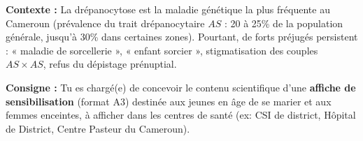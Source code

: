 \documentclass[11pt]{article}
\begin{document}
\begin{exercice}
\textbf{Contexte :} La drépanocytose est la maladie génétique la plus fréquente au Cameroun (prévalence du trait drépanocytaire $AS$ : 20 à 25\% de la population générale, jusqu'à 30\% dans certaines zones). Pourtant, de forts préjugés persistent : « maladie de sorcellerie », « enfant sorcier », stigmatisation des couples $AS \times AS$, refus du dépistage prénuptial.

\textbf{Consigne :} Tu es chargé(e) de concevoir le contenu scientifique d'une \textbf{affiche de sensibilisation} (format A3) destinée aux jeunes en âge de se marier et aux femmes enceintes, à afficher dans les centres de santé (ex: CSI de district, Hôpital de District, Centre Pasteur du Cameroun).


\end{exercice}
\end{document}
